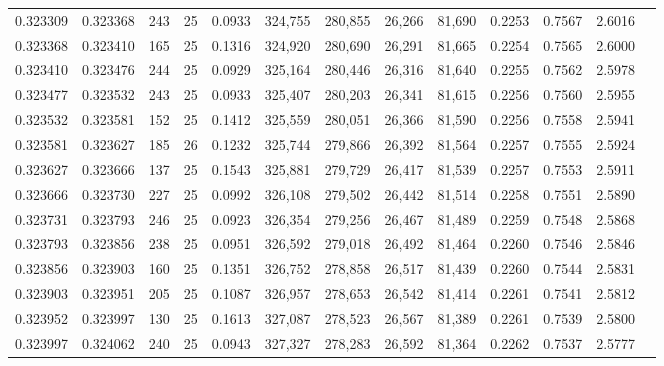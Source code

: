 \begin{tabular}{rrrrrrrrrrrrr}
0.323309 & 0.323368 &   243 &  25 &                                     0.0933 & 324,755 & 280,855 &  26,266 &  81,690 & 0.2253 & 0.7567 & 2.6016 \\
0.323368 & 0.323410 &   165 &  25 &                                     0.1316 & 324,920 & 280,690 &  26,291 &  81,665 & 0.2254 & 0.7565 & 2.6000 \\
0.323410 & 0.323476 &   244 &  25 &                                     0.0929 & 325,164 & 280,446 &  26,316 &  81,640 & 0.2255 & 0.7562 & 2.5978 \\
0.323477 & 0.323532 &   243 &  25 &                                     0.0933 & 325,407 & 280,203 &  26,341 &  81,615 & 0.2256 & 0.7560 & 2.5955 \\
0.323532 & 0.323581 &   152 &  25 &                                     0.1412 & 325,559 & 280,051 &  26,366 &  81,590 & 0.2256 & 0.7558 & 2.5941 \\
0.323581 & 0.323627 &   185 &  26 &                                     0.1232 & 325,744 & 279,866 &  26,392 &  81,564 & 0.2257 & 0.7555 & 2.5924 \\
0.323627 & 0.323666 &   137 &  25 &                                     0.1543 & 325,881 & 279,729 &  26,417 &  81,539 & 0.2257 & 0.7553 & 2.5911 \\
0.323666 & 0.323730 &   227 &  25 &                                     0.0992 & 326,108 & 279,502 &  26,442 &  81,514 & 0.2258 & 0.7551 & 2.5890 \\
0.323731 & 0.323793 &   246 &  25 &                                     0.0923 & 326,354 & 279,256 &  26,467 &  81,489 & 0.2259 & 0.7548 & 2.5868 \\
0.323793 & 0.323856 &   238 &  25 &                                     0.0951 & 326,592 & 279,018 &  26,492 &  81,464 & 0.2260 & 0.7546 & 2.5846 \\
0.323856 & 0.323903 &   160 &  25 &                                     0.1351 & 326,752 & 278,858 &  26,517 &  81,439 & 0.2260 & 0.7544 & 2.5831 \\
0.323903 & 0.323951 &   205 &  25 &                                     0.1087 & 326,957 & 278,653 &  26,542 &  81,414 & 0.2261 & 0.7541 & 2.5812 \\
0.323952 & 0.323997 &   130 &  25 &                                     0.1613 & 327,087 & 278,523 &  26,567 &  81,389 & 0.2261 & 0.7539 & 2.5800 \\
0.323997 & 0.324062 &   240 &  25 &                                     0.0943 & 327,327 & 278,283 &  26,592 &  81,364 & 0.2262 & 0.7537 & 2.5777 \\

\end{tabular}
